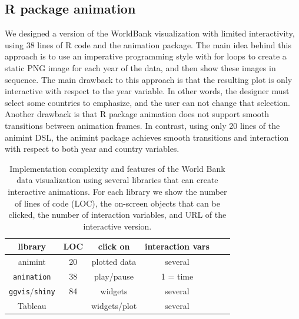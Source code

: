 \documentclass[journal]{vgtc}\usepackage[]{graphicx}\usepackage[]{color}
\begin{document}
\subsection{R package animation}
\label{sec:compare-animation}

We designed a version of the WorldBank visualization with limited
interactivity, using 38 lines of R code and the animation
package. The main idea behind this approach is to use an imperative
programming style with for loops to create a static PNG image for each
year of the data, and then show these images in sequence. The main
drawback to this approach is that the resulting plot is only
interactive with respect to the year variable. In other words, the
designer must select some countries to emphasize, and the user can not
change that selection. Another drawback is that R package
animation does not support smooth transitions between
animation frames. In contrast, using only 20 lines of the animint DSL,
the animint package achieves smooth transitions and interaction with
respect to both year and country variables.

\begin{table}[t!]
  \caption{Implementation complexity and features
    of the World Bank data visualization
    using several libraries that can create interactive animations.
    For each library
    we show the number of lines of code (LOC), the on-screen objects
    that can be clicked,  the
    number of interaction variables, and URL of the interactive version.
  }
 \label{tab:packages}
 \begin{center}
  \begin{tabular}{cccccc}
    library &
    LOC &
    click on &
    interaction vars
    \\
    \hline
    animint &
    20 &
    plotted data &
    several &
    \\
    \texttt{animation} &
    38 &
    play/pause &
    1 = time &
    \\
    \texttt{ggvis}/\texttt{shiny} &
    84 &
    widgets &
    several &
    \\
    Tableau &
      &
    widgets/plot &
    several &
    \\
  \end{tabular}
 \end{center}
\end{table}
\end{document}
